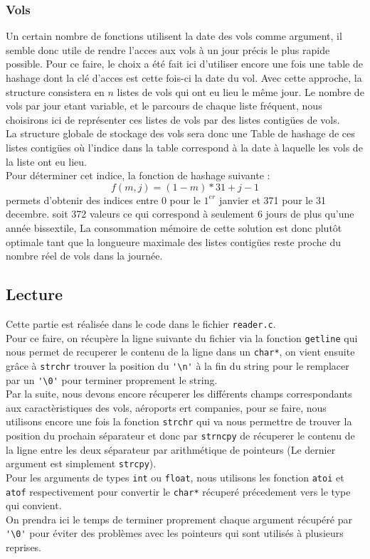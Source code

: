 \documentclass[a4paper, 9pt]{article}
\begin{document}
	\subsubsection{Vols}
	Un certain nombre de fonctions utilisent la date des vols comme argument, il semble donc utile de rendre l'acces aux vols à un jour précis le plus rapide possible. Pour ce faire, le choix a été fait ici d'utiliser encore une fois une table de hashage dont la clé d'acces est cette fois-ci la date du vol. Avec cette approche, la structure consistera en $n$ listes de vols qui ont eu lieu le même jour. Le nombre de vols par jour etant variable, et le parcours de chaque liste fréquent, nous choisirons ici de représenter ces listes de vols par des listes contigües de vols.\\
	La structure globale de stockage des vols sera donc une Table de hashage de ces listes contigües où l'indice dans la table correspond à la date à laquelle les vols de la liste ont eu lieu.\\
	Pour déterminer cet indice, la fonction de hashage suivante :\\
	\begin{equation}
		f(m, j) = (1-m)*31 + j -1
	\end{equation}
	permets d'obtenir des indices entre 0 pour le $1^{er}$ janvier et 371 pour le 31 decembre. soit 372 valeurs ce qui correspond à seulement 6 jours de plus qu'une année bissextile, La consommation mémoire de cette solution est donc plutôt optimale tant que la longueure maximale des listes contigües reste proche du nombre réel de vols dans la journée.\\
	
	\subsection{Lecture}
	Cette partie est réalisée dans le code dans le fichier \lstinline|reader.c|.\\
	Pour ce faire, on récupère la ligne suivante du fichier via la fonction \verb*|getline| qui nous permet de recuperer le contenu de la ligne dans un \lstinline|char*|, on vient ensuite grâce à \verb*|strchr| trouver la position du \lstinline|'\n'| à la fin du string pour le remplacer par un \lstinline|'\0'| pour terminer proprement le string.\\
	Par la suite, nous devons encore récuperer les différents champs correspondants aux caractèristiques des vols, aéroports ert companies, pour se faire, nous utilisons encore une fois la fonction \verb|strchr| qui va nous permettre de trouver la position du prochain séparateur et donc par \verb*|strncpy| de récuperer le contenu de la ligne entre les deux séparateur par arithmétique de pointeurs (Le dernier argument est simplement \verb*|strcpy|).\\
	Pour les arguments de types \lstinline|int| ou \lstinline|float|, nous utilisons les fonction \verb*|atoi| et \verb*|atof| respectivement pour convertir le \lstinline|char*| récuperé précedement vers le type qui convient.\\
	On prendra ici le temps de terminer proprement chaque argument récupéré par \lstinline|'\0'| pour éviter des problèmes avec les pointeurs qui sont utilisés à plusieurs reprises.
	
\end{document}
